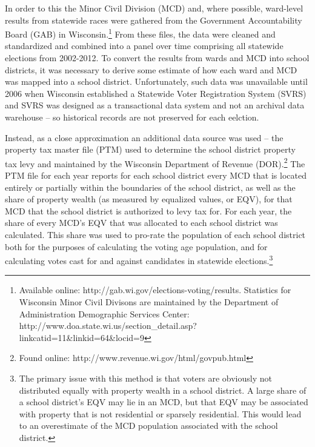 In order to this the Minor Civil Division (MCD) and, where possible, ward-level 
results from statewide races were gathered from the Government Accountability Board 
(GAB) in Wisconsin.\footnote{Available online: http://gab.wi.gov/elections-voting/results. 
Statistics for Wisconsin Minor Civil Divisons are maintained by the Department of Administration 
Demographic Services Center: http://www.doa.state.wi.us/section\_detail.asp?linkcatid=11\&linkid=64\&locid=9} 
From these files, the data were cleaned and standardized and combined into a panel 
over time comprising all statewide elections from 2002-2012. To convert the results 
from wards and MCD into school districts, it was necessary to derive some estimate of 
how each ward and MCD was mapped into a school district. Unfortunately, such data 
was unavailable until 2006 when Wisconsin established a Statewide Voter Registration System 
(SVRS) and SVRS was designed as a transactional data system and not an archival data 
warehouse -- so historical records are not preserved for each eelction. 

Instead, as a close approximation an additional data source was used -- the property 
tax master file (PTM) used to determine the school district property tax levy and 
maintained by the Wisconsin Department of Revenue (DOR).\footnote{Found online: http://www.revenue.wi.gov/html/govpub.html} 
The PTM file for each year reports for each school district every MCD that is 
located entirely or partially within the boundaries of the school district, as 
well as the share of property wealth (as measured by equalized values, or EQV), 
for that MCD that the school district is authorized to levy tax for. For each year, 
the share of every MCD's EQV that was allocated to each school district was 
calculated. This share was used to pro-rate the population of each school district 
both for the purposes of calculating the voting age population, and for calculating 
votes cast for and against candidates in statewide elections.\footnote{The primary 
issue with this method is that voters are obviously not distributed equally with 
property wealth in a school district. A large share of a school district's EQV 
may lie in an MCD, but that EQV may be associated with property that is not residential 
or sparsely residential. This would lead to an overestimate of the MCD population 
associated with the school district.}

